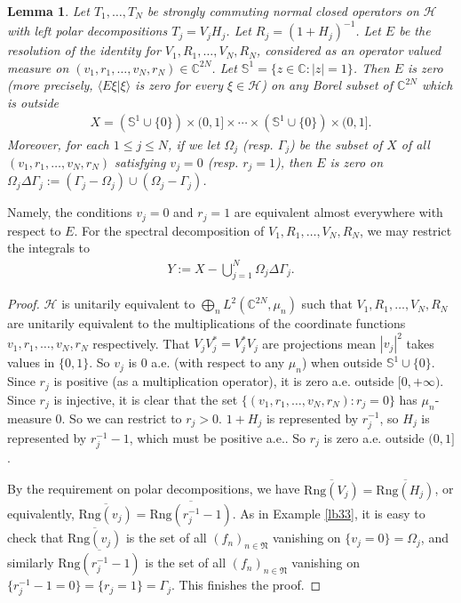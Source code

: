 \documentclass[12pt,a4paper,notitlepage]{article}
\theoremstyle{definition}
\theoremstyle{plain}
\newtheorem{lm}[df]{Lemma}
\newcommand{\fk}{\mathfrak}
\newcommand{\mc}{\mathcal}
\newcommand{\ovl}{\overline}
\newcommand{\bk}[1]{\langle {#1}\rangle}
\newcommand{\mbb}{\mathbb}
\newcommand{\Cbb}{\mathbb C}
\newcommand{\Rng}{\mathrm{Rng}}
\numberwithin{equation}{section}
\begin{document}
\begin{lm}\label{lb36}
Let $T_1,\dots,T_N$ be strongly commuting normal closed operators on $\mc H$ with left polar decompositions $T_j=V_jH_j$. Let $R_j=(1+H_j)^{-1}$. Let $E$ be the resolution of the identity for $V_1,R_1,\dots,V_N,R_N$, considered as an operator valued measure on $(v_1,r_1,\dots,v_N,r_N)\in\Cbb^{2N}$. Let $\mbb S^1=\{z\in\Cbb:|z|=1\}$.  Then $E$ is zero (more precisely, $\bk{E\xi|\xi}$ is zero for every $\xi\in\mc H$) on any Borel subset of $\Cbb^{2N}$ which is outside
\begin{align*}
X=(\mbb S^1\cup\{0\})\times(0,1]\times\cdots\times(\mbb S^1\cup\{0\})\times(0,1].
\end{align*}
Moreover, for each $1\leq j\leq N$, if we let $\Omega_j$ (resp. $\Gamma_j$) be the subset of $X$ of all $(v_1,r_1,\dots,v_N,r_N)$ satisfying $v_j=0$ (resp. $r_j=1$), then $E$ is zero on $\Omega_j\Delta\Gamma_j:=(\Gamma_j-\Omega_j)\cup(\Omega_j-\Gamma_j)$.
\end{lm}

Namely, the conditions $v_j=0$ and $r_j=1$ are equivalent almost everywhere with respect to $E$. For the spectral decomposition of  $V_1,R_1,\dots,V_N,R_N$, we may restrict the integrals to
\begin{align}
Y:=X-\bigcup_{j=1}^N \Omega_j\Delta\Gamma_j.\label{eq13}
\end{align}

\begin{proof}
$\mc H$ is unitarily equivalent to $\bigoplus_n L^2(\Cbb^{2N},\mu_n)$ such that $V_1,R_1,\dots,V_N,R_N$ are unitarily equivalent to the multiplications of the coordinate functions $v_1,r_1,\dots,v_N,r_N$ respectively. That $V_jV_j^*=V_j^*V_j$ are projections mean $|v_j|^2$ takes values in $\{0,1\}$. So $v_j$ is $0$ a.e. (with respect to any $\mu_n$) when outside $\mbb S^1\cup\{0\}$. Since $r_j$ is positive (as a multiplication operator), it is zero a.e. outside $[0,+\infty)$. Since $r_j$ is injective, it is clear that the set $\{(v_1,r_1,\dots,v_N,r_N):r_j=0\}$ has $\mu_n$-measure $0$. So we can restrict to $r_j>0$. $1+H_j$ is represented by $r_j^{-1}$, so $H_j$ is represented by $r_j^{-1}-1$, which must be positive a.e.. So $r_j$ is zero a.e. outside $(0,1]$.

By the requirement on polar decompositions, we have $\ovl{\Rng(V_j)}=\ovl{\Rng(H_j)}$, or equivalently, $\ovl{\Rng(v_j)}=\ovl{\Rng(r_j^{-1}-1)}$. As in Example \ref{lb33}, it is easy to check that $\ovl{\Rng(v_j)}$ is the set of all $(f_n)_{n\in\fk N}$ vanishing on $\{v_j=0\}=\Omega_j$, and similarly  $\ovl{\Rng(r_j^{-1}-1)}$ is the set of all $(f_n)_{n\in\fk N}$ vanishing on $\{r_j^{-1}-1=0\}=\{r_j=1\}=\Gamma_j$. This finishes the proof.
\end{proof}
\end{document}
